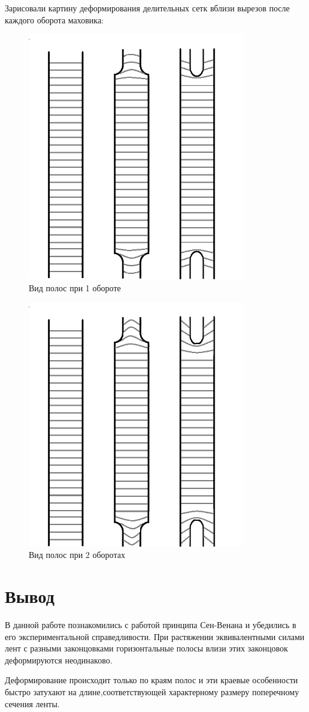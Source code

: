 \documentclass[12pt, a4paper]{article}
\begin{document}
	Зарисовали картину деформирования делительных сетк вблизи вырезов после каждого оборота маховика:
	
 \begin{figure}[h!]
\centering
\includegraphics[width = 9.5cm]{omg_1.png}
\caption{Вид полос при 1 обороте}
\label{pic}
\end{figure} 
\hfill

    \begin{figure}[h!]
\centering
\includegraphics[width = 9.5cm]{omg_2.png}
\caption{Вид полос при 2 оборотах}
\label{one_more_pic}
\end{figure}


\newpage 	 

\section{Вывод}

	В данной работе познакомились с работой принципа Сен-Венана и убедились в его экспериментальной  справедливости. При растяжении эквивалентными силами лент с разными законцовками горизонтальные полосы влизи этих законцовок деформируются неодинаково.
	
	Деформирование происходит только по краям полос и эти краевые особенности быстро затухают на длине,соответствующей характерному размеру поперечному сечения ленты.
\end{document}
